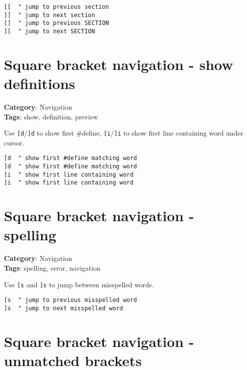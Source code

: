 {{{{{{{{{{\begin{Exa*}{}
\begin{Verbatim}[fontsize=\footnotesize, breaklines, breakanywhere]
[[  " jump to previous section
]]  " jump to next section
[]  " jump to previous SECTION
][  " jump to next SECTION
\end{Verbatim}
\end{Exa*}

\section{Square bracket navigation - show definitions}

\textbf{Category}: Navigation\\ \textbf{Tags}: show, definition, preview
\vspace{0.5cm}

Use {\footnotesize \Verb§[d§}/{\footnotesize \Verb§]d§} to show first \#define, {\footnotesize \Verb§[i§}/{\footnotesize \Verb§]i§} to show first line containing word under cursor.

\begin{Exa*}{}
\begin{Verbatim}[fontsize=\footnotesize, breaklines, breakanywhere]
[d  " show first #define matching word
]d  " show first #define matching word
[i  " show first line containing word
]i  " show first line containing word
\end{Verbatim}
\end{Exa*}

\section{Square bracket navigation - spelling}

\textbf{Category}: Navigation\\ \textbf{Tags}: spelling, error, navigation
\vspace{0.5cm}

Use {\footnotesize \Verb§[s§} and {\footnotesize \Verb§]s§} to jump between misspelled words.

\begin{Exa*}{}
\begin{Verbatim}[fontsize=\footnotesize, breaklines, breakanywhere]
[s  " jump to previous misspelled word
]s  " jump to next misspelled word
\end{Verbatim}
\end{Exa*}

\section{Square bracket navigation - unmatched brackets}

}}}}}}}}}}
